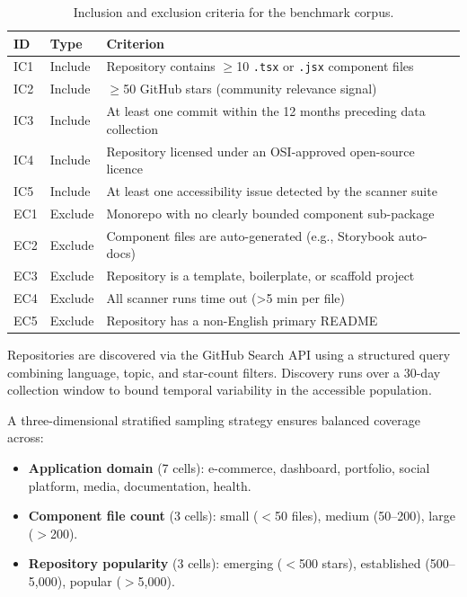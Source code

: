 \begin{table}[htbp]
\caption{Inclusion and exclusion criteria for the benchmark corpus.}
\label{tab:ic_ec}
\centering\small
\renewcommand{\arraystretch}{1.3}
\begin{tabular}{llp{}}
\toprule
\textbf{ID} & \textbf{Type} & \textbf{Criterion} \\
\midrule
IC1 & Include & Repository contains $\geq$10 \texttt{.tsx} or \texttt{.jsx} component files \\
IC2 & Include & $\geq$50 GitHub stars (community relevance signal) \\
IC3 & Include & At least one commit within the 12 months preceding data collection \\
IC4 & Include & Repository licensed under an OSI-approved open-source licence \\
IC5 & Include & At least one accessibility issue detected by the scanner suite \\
\midrule
EC1 & Exclude & Monorepo with no clearly bounded component sub-package \\
EC2 & Exclude & Component files are auto-generated (e.g., Storybook auto-docs) \\
EC3 & Exclude & Repository is a template, boilerplate, or scaffold project \\
EC4 & Exclude & All scanner runs time out (\textgreater{}5 min per file) \\
EC5 & Exclude & Repository has a non-English primary README \\
\bottomrule
\end{tabular}
\end{table}

Repositories are discovered via the GitHub Search API using a structured
query combining language, topic, and star-count filters.  Discovery runs over
a 30-day collection window to bound temporal variability in the accessible
population.

A three-dimensional stratified sampling strategy ensures balanced coverage
across:

\begin{itemize}
  \item \textbf{Application domain} (7 cells): e-commerce, dashboard,
    portfolio, social platform, media, documentation, health.
  \item \textbf{Component file count} (3 cells): small ($<$50 files),
    medium (50--200), large ($>$200).
  \item \textbf{Repository popularity} (3 cells): emerging ($<$500 stars),
    established (500--5,000), popular ($>$5,000).
\end{itemize}

